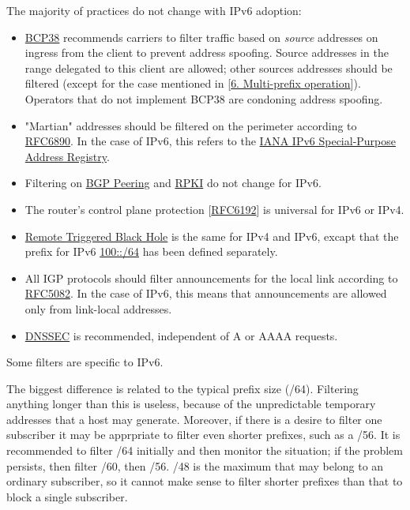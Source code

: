 \documentclass[
]{article}
\providecommand{\tightlist}{%
  \setlength{\itemsep}{0pt}\setlength{\parskip}{0pt}}
\begin{document}
The majority of practices do not change with IPv6 adoption:

\begin{itemize}
\tightlist
\item
  \href{https://www.rfc-editor.org/info/bcp38}{BCP38} recommends
  carriers to filter traffic based on \emph{source} addresses on ingress
  from the client to prevent address spoofing. Source addresses in the
  range delegated to this client are allowed; other sources addresses
  should be filtered (except for the case mentioned in
  {[}\hyperref[multi-prefix-operation]{6. Multi-prefix operation}{]}).
  Operators that do not implement BCP38 are condoning address spoofing.
\item
  "Martian" addresses should be filtered on the perimeter according to
  \href{https://www.rfc-editor.org/info/rfc6890}{RFC6890}. In the case
  of IPv6, this refers to the
  \href{https://www.iana.org/assignments/iana-ipv6-special-registry/iana-ipv6-special-registry.xhtml}{IANA
  IPv6 Special-Purpose Address Registry}.
\item
  Filtering on \href{https://www.rfc-editor.org/info/rfc7454}{BGP
  Peering} and \href{https://www.rfc-editor.org/info/rfc8210}{RPKI} do
  not change for IPv6.
\item
  The router's control plane protection
  {[}\href{https://www.rfc-editor.org/info/rfc6192}{RFC6192}{]} is
  universal for IPv6 or IPv4.
\item
  \href{https://www.rfc-editor.org/info/rfc5635}{Remote Triggered Black
  Hole} is the same for IPv4 and IPv6, excapt that the prefix for IPv6
  \href{https://www.rfc-editor.org/info/rfc6666}{100::/64} has been
  defined separately.
\item
  All IGP protocols should filter announcements for the local link
  according to \href{https://www.rfc-editor.org/info/rfc5082}{RFC5082}.
  In the case of IPv6, this means that announcements are allowed only
  from link-local addresses.
\item
  \href{https://www.rfc-editor.org/info/rfc4641}{DNSSEC} is recommended,
  independent of A or AAAA requests.
\end{itemize}

Some filters are specific to IPv6.

The biggest difference is related to the typical prefix size (/64).
Filtering anything longer than this is useless, because of the
unpredictable temporary addresses that a host may generate. Moreover, if
there is a desire to filter one subscriber it may be apprpriate to
filter even shorter prefixes, such as a /56. It is recommended to filter
/64 initially and then monitor the situation; if the problem persists,
then filter /60, then /56. /48 is the maximum that may belong to an
ordinary subscriber, so it cannot make sense to filter shorter prefixes
than that to block a single subscriber.
\end{document}
